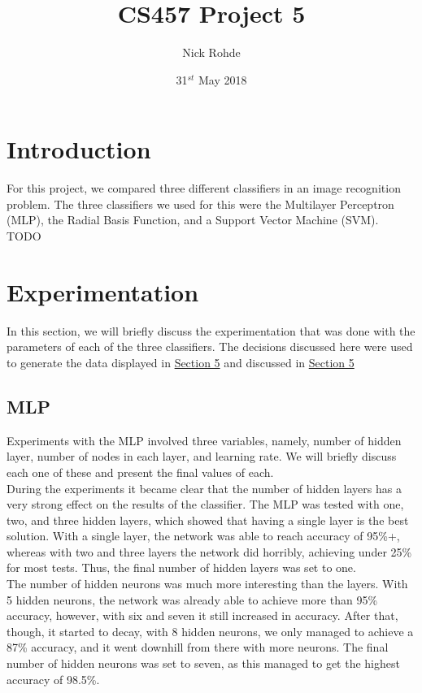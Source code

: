 \documentclass{article}
\title{CS457 Project 5}
\author{Nick Rohde}
\date{31$^{st}$ May 2018}
\begin{document}
\maketitle
\tableofcontents
\pagebreak

\section{Introduction} \label{S1}
	For this project, we compared three different classifiers in an image recognition problem. The three classifiers we used for this were the Multilayer Perceptron (MLP), the Radial Basis Function, and a Support Vector Machine (SVM). TODO \\



\section{Experimentation} \label{S2}
	In this section, we will briefly discuss the experimentation that was done with the parameters of each of the three classifiers. The decisions discussed here were used to generate the data displayed in \hyperref[S5]{Section 5} and discussed in \hyperref[S4]{Section 5}
	
	\subsection{MLP}
		Experiments with the MLP involved three variables, namely, number of hidden layer, number of nodes in each layer, and learning rate. We will briefly discuss each one of these and present the final values of each.\\
		
		During the experiments it became clear that the number of hidden layers has a very strong effect on the results of the classifier. The MLP was tested with one, two, and three hidden layers, which showed that having a single layer is the best solution. With a single layer, the network was able to reach accuracy of 95\%+, whereas with two and three layers the network did horribly, achieving under 25\% for most tests. Thus, the final number of hidden layers was set to one.\\
		
		The number of hidden neurons was much more interesting than the layers. With 5 hidden neurons, the network was already able to achieve more than 95\% accuracy, however, with six and seven it still increased in accuracy. After that, though, it started to decay, with 8 hidden neurons, we only managed to achieve a 87\% accuracy, and it went downhill from there with more neurons. The final number of hidden neurons was set to seven, as this managed to get the highest accuracy of 98.5\%.\\
		
\end{document}
